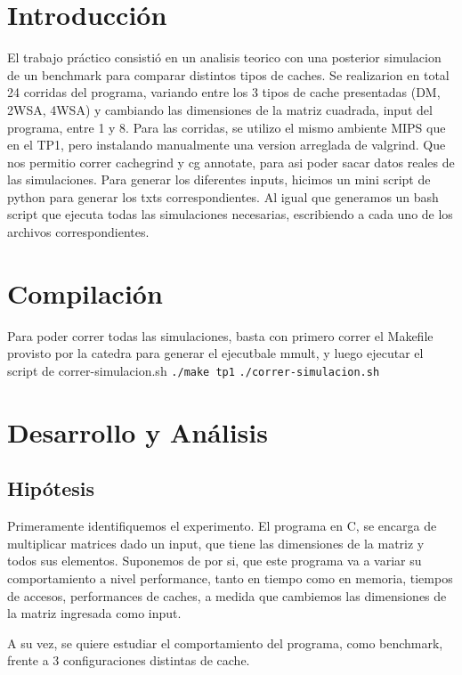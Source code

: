 \documentclass[11pt,a4paper]{article}
\newcommand\blankpage{%
	\null
	\thispagestyle{empty}%
	\addtocounter{page}{-1}%
	\newpage}
\begin{document}
\blankpage

\tableofcontents

\newpage

\section{Introducción}
El trabajo práctico consistió en un analisis teorico con una posterior simulacion de un benchmark para comparar distintos tipos de caches. Se realizarion en total 24 corridas del programa, variando entre los 3 tipos de cache presentadas (DM, 2WSA, 4WSA) y cambiando las dimensiones de la matriz cuadrada, input del programa, entre 1 y 8.
Para las corridas, se utilizo el mismo ambiente MIPS que en el TP1, pero instalando manualmente una version arreglada de valgrind. Que nos permitio correr cachegrind y cg annotate, para asi poder sacar datos reales de las simulaciones. 
Para generar los diferentes inputs, hicimos un mini script de python para generar los txts correspondientes. Al igual que generamos un bash script que ejecuta todas las simulaciones necesarias, escribiendo a cada uno de los archivos correspondientes.


\section{Compilación}
Para poder correr todas las simulaciones, basta con primero correr el Makefile provisto por la catedra para generar el ejecutbale mmult, y luego ejecutar el script de correr-simulacion.sh
\texttt{./make tp1}
\texttt{./correr-simulacion.sh}

\section{Desarrollo y Análisis}

\subsection{Hipótesis}
Primeramente identifiquemos el experimento. El programa en C, se encarga de multiplicar matrices dado un input, que tiene las dimensiones de la matriz y todos sus elementos.
Suponemos de por si, que este programa va a variar su comportamiento a nivel performance, tanto en tiempo como en memoria, tiempos de accesos, performances de caches, a medida que cambiemos las dimensiones de la matriz ingresada como input.

A su vez, se quiere estudiar el comportamiento del programa, como benchmark, frente a 3 configuraciones distintas de cache.
\end{document}
